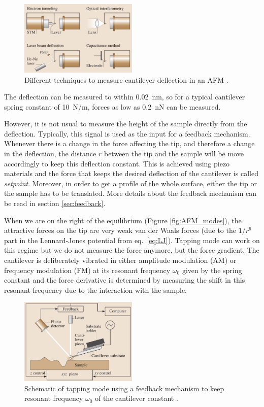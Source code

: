 \documentclass[11pt,a4paper]{article}
\begin{document}
\begin{figure}[ht]
\centering
\includegraphics[width=0.5\textwidth]{Deflection}
\caption{Different techniques to measure cantilever deflection in an AFM \cite{Bhushan}.}
\label{fig:Deflection_measurement}
\end{figure}

The deflection can be measured to within \SI{0.02}{\nm}, so for a typical cantilever spring constant of \SI{10}{\N/\m}, forces as low as \SI{0.2}{\nano\N} can be measured.

However, it is not usual to measure the height of the sample directly from the deflection. Typically, this signal is used as the input for a feedback mechanism. Whenever there is a change in the force affecting the tip, and therefore a change in the deflection, the distance $r$ between the tip and the sample will be move accordingly to keep this deflection constant. This is achieved using piezo materials and the force that keeps the desired deflection of the cantilever is called \emph{setpoint}. Moreover, in order to get a profile of the whole surface, either the tip or the sample has to be translated. More details about the feedback mechanism can be read in section \ref{sec:feedback}.

When we are on the right of the equilibrium (Figure \ref{fig:AFM_modes}), the attractive forces on the tip are very weak van der Waals forces (due to the $1/r^6$ part in the Lennard-Jones potential from eq.~\eqref{eq:LJ}). Tapping mode can work on this regime but we do not measure the force anymore, but the force gradient. The cantilever is deliberately vibrated in either amplitude modulation (AM) or frequency modulation (FM) at its resonant frequency $\omega_0$ given by the spring constant and the force derivative is determined by measuring the shift in this resonant frequency due to the interaction with the sample.

\begin{figure}[ht]
\centering
\includegraphics[width=0.5\textwidth]{Tapping_mode}
\caption{Schematic of tapping mode using a feedback mechanism to keep resonant frequency $\omega_0$ of the cantilever constant \cite{Bhushan}.}
\label{fig:Deflection_measurement}
\end{figure}
\end{document}

